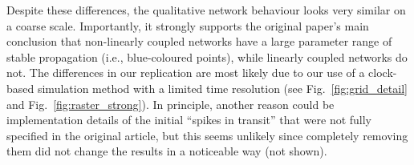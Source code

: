 \documentclass[10pt,a4paper,onecolumn]{article}
\begin{document}
Despite these differences, the qualitative network behaviour looks very similar on a coarse scale. Importantly, it strongly supports the original paper's main conclusion that non-linearly coupled networks have a large parameter range of stable propagation (i.e., blue-coloured points), while linearly coupled networks do not. The differences in our replication are most likely due to our use of a clock-based simulation method with a limited time resolution (see Fig.~\ref{fig:grid_detail} and Fig.~\ref{fig:raster_strong}). In principle, another reason could be implementation details of the initial ``spikes in transit'' that were not fully specified in the original article, but this seems unlikely since completely removing them did not change the results in a noticeable way (not shown).
\end{document}
